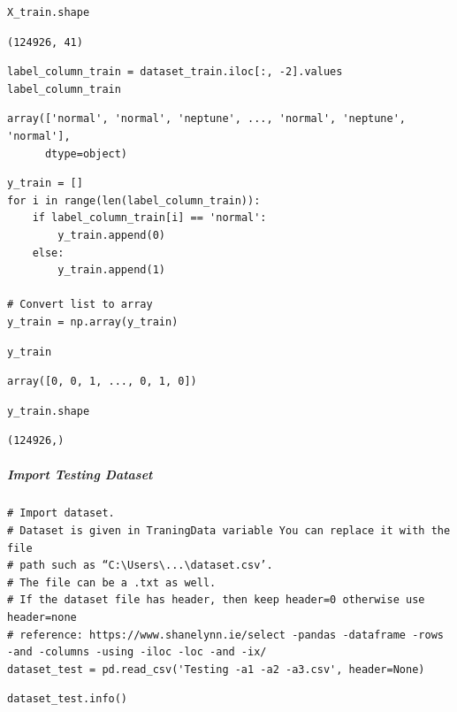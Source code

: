 \begin{verbatim}
X_train.shape
\end{verbatim}

\begin{verbatim}
(124926, 41)
\end{verbatim}

\begin{verbatim}
label_column_train = dataset_train.iloc[:, -2].values
label_column_train
\end{verbatim}

\begin{verbatim}
array(['normal', 'normal', 'neptune', ..., 'normal', 'neptune', 'normal'],
      dtype=object)
\end{verbatim}

\begin{verbatim}
y_train = []
for i in range(len(label_column_train)):
    if label_column_train[i] == 'normal':
        y_train.append(0)
    else:
        y_train.append(1)

# Convert list to array
y_train = np.array(y_train)
\end{verbatim}

\begin{verbatim}
y_train
\end{verbatim}

\begin{verbatim}
array([0, 0, 1, ..., 0, 1, 0])
\end{verbatim}

\begin{verbatim}
y_train.shape
\end{verbatim}

\begin{verbatim}
(124926,)
\end{verbatim}

\subparagraph{Import Testing Dataset}

\begin{verbatim}
# Import dataset.
# Dataset is given in TraningData variable You can replace it with the file 
# path such as “C:\Users\...\dataset.csv’. 
# The file can be a .txt as well. 
# If the dataset file has header, then keep header=0 otherwise use header=none
# reference: https://www.shanelynn.ie/select -pandas -dataframe -rows -and -columns -using -iloc -loc -and -ix/
dataset_test = pd.read_csv('Testing -a1 -a2 -a3.csv', header=None)
\end{verbatim}

\begin{verbatim}
dataset_test.info()
\end{verbatim}

